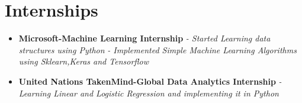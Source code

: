 \documentclass[a4paper,12pt]{article}
\begin{document}
\section*{Internships}
\begin{itemize}
    \item{\textbf{\large{Microsoft-Machine Learning Internship}}
    \newline
    \textit{- Started Learning data structures using Python}
    \newline
    \textit{- Implemented Simple Machine Learning Algorithms using Sklearn,Keras and Tensorflow}}
\end{itemize}
\begin{itemize}
    \item{\textbf{\large{United Nations TakenMind-Global Data Analytics Internship}}
    \newline
    \textit{- Learning Linear and Logistic Regression and implementing it in Python}}
\end{itemize}



\end{document}
